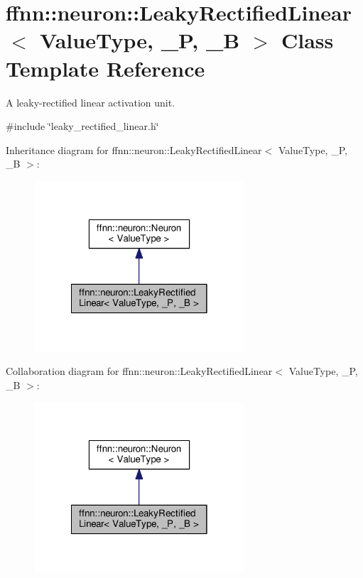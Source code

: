 \hypertarget{classffnn_1_1neuron_1_1_leaky_rectified_linear}{\section{ffnn\-:\-:neuron\-:\-:Leaky\-Rectified\-Linear$<$ Value\-Type, \-\_\-\-P, \-\_\-\-B $>$ Class Template Reference}
\label{classffnn_1_1neuron_1_1_leaky_rectified_linear}
}


A leaky-\/rectified linear activation unit.  




{\ttfamily \#include \char`\"{}leaky\-\_\-rectified\-\_\-linear.\-h\char`\"{}}



Inheritance diagram for ffnn\-:\-:neuron\-:\-:Leaky\-Rectified\-Linear$<$ Value\-Type, \-\_\-\-P, \-\_\-\-B $>$\-:
\nopagebreak
\begin{figure}[H]
\begin{center}
\leavevmode
\includegraphics[width=222pt]{classffnn_1_1neuron_1_1_leaky_rectified_linear__inherit__graph}
\end{center}
\end{figure}


Collaboration diagram for ffnn\-:\-:neuron\-:\-:Leaky\-Rectified\-Linear$<$ Value\-Type, \-\_\-\-P, \-\_\-\-B $>$\-:
\nopagebreak
\begin{figure}[H]
\begin{center}
\leavevmode
\includegraphics[width=222pt]{classffnn_1_1neuron_1_1_leaky_rectified_linear__coll__graph}
\end{center}
\end{figure}
